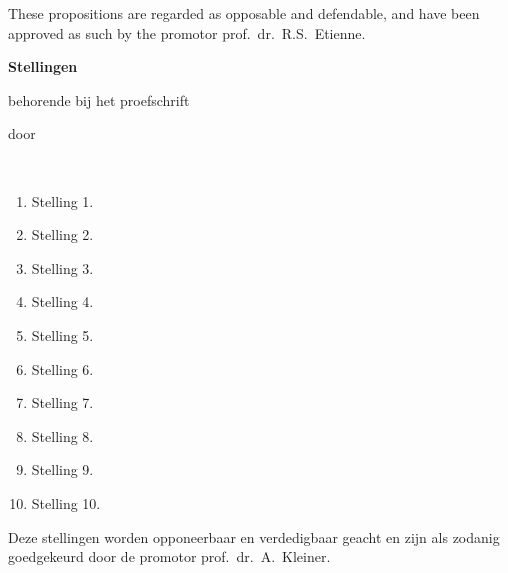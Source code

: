 \documentclass{propositions}
\begin{document}
\bigskip
\bigskip

\begin{center}
These propositions are regarded as opposable and defendable, and have been approved as such by the promotor prof.\ dr.\ R.S.\ Etienne.
\end{center}

\clearpage
{

\begin{center}

{\Large\titlefont\bfseries Stellingen}

\bigskip

behorende bij het proefschrift

\bigskip

{\makeatletter
\titlestyle\bfseries\large\@title
\makeatother}

{\makeatletter
\ifx\@subtitle\undefined\else
    \titlefont\titleshape\@subtitle
\fi
\makeatother}

\bigskip

door

\bigskip

\makeatletter
{\large\titlefont\bfseries\@firstname\ {\titleshape\@lastname}}
\makeatother

\end{center}

\bigskip
\bigskip

\begin{enumerate}

\item Stelling 1.
\item Stelling 2.
\item Stelling 3.
\item Stelling 4.
\item Stelling 5.
\item Stelling 6.
\item Stelling 7.
\item Stelling 8.
\item Stelling 9.
\item Stelling 10.

\end{enumerate}

\bigskip
\bigskip

\begin{center}
Deze stellingen worden opponeerbaar en verdedigbaar geacht en zijn als zodanig goedgekeurd door de promotor prof.\ dr.\ A.\ Kleiner.
\end{center}

}
\end{document}
